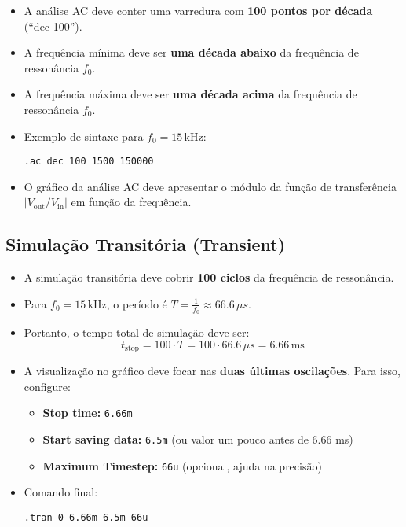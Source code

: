 \begin{table}[H]
\begin{itemize}
    \item A análise AC deve conter uma varredura com \textbf{100 pontos por década} (``dec 100'').
    \item A frequência mínima deve ser \textbf{uma década abaixo} da frequência de ressonância $f_0$.
    \item A frequência máxima deve ser \textbf{uma década acima} da frequência de ressonância $f_0$.
    \item Exemplo de sintaxe para $f_0 = 15\,\text{kHz}$:
    \begin{center}
        \verb|.ac dec 100 1500 150000|
    \end{center}
    \item O gráfico da análise AC deve apresentar o módulo da função de transferência $|V_{\text{out}}/V_{\text{in}}|$ em função da frequência.
\end{itemize}

\subsection*{Simulação Transitória (Transient)}

\begin{itemize}
    \item A simulação transitória deve cobrir \textbf{100 ciclos} da frequência de ressonância.
    \item Para $f_0 = 15\,\text{kHz}$, o período é $T = \frac{1}{f_0} \approx 66.6\,\mu s$.
    \item Portanto, o tempo total de simulação deve ser:
    \[
        t_{\text{stop}} = 100 \cdot T = 100 \cdot 66.6\,\mu s = 6.66\,\text{ms}
    \]
    \item A visualização no gráfico deve focar nas \textbf{duas últimas oscilações}. Para isso, configure:
    \begin{itemize}
        \item \textbf{Stop time:} \verb|6.66m|
        \item \textbf{Start saving data:} \verb|6.5m| (ou valor um pouco antes de 6.66 ms)
        \item \textbf{Maximum Timestep:} \verb|66u| (opcional, ajuda na precisão)
    \end{itemize}
    \item Comando final:
    \begin{center}
        \verb|.tran 0 6.66m 6.5m 66u|
    \end{center}
\end{itemize}


\end{table}
